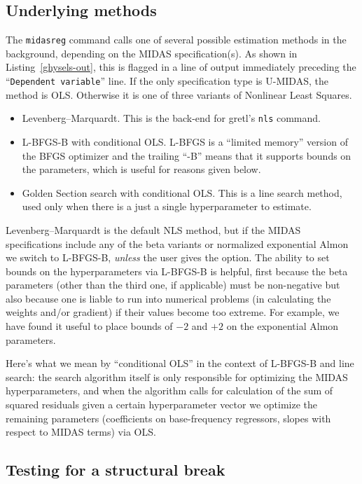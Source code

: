 \subsection{Underlying methods}

The \texttt{midasreg} command calls one of several possible estimation
methods in the background, depending on the MIDAS specification(s). As
shown in Listing~\ref{ghysels-out}, this is flagged in a line of
output immediately preceding the ``\texttt{Dependent variable}'' line.
If the only specification type is U-MIDAS, the method is
OLS. Otherwise it is one of three variants of Nonlinear Least Squares.
\begin{itemize}
\item Levenberg--Marquardt. This is the back-end for gretl's
  \texttt{nls} command.
\item L-BFGS-B with conditional OLS. L-BFGS is a ``limited memory''
  version of the BFGS optimizer and the trailing ``-B'' means that it
  supports bounds on the parameters, which is useful for reasons given
  below.
\item Golden Section search with conditional OLS. This is a line
  search method, used only when there is a just a single
  hyperparameter to estimate.
\end{itemize}

Levenberg--Marquardt is the default NLS method, but if the MIDAS
specifications include any of the beta variants or normalized
exponential Almon we switch to L-BFGS-B, \textit{unless} the user
gives the  option. The ability to set bounds on the
hyperparameters via L-BFGS-B is helpful, first because the beta
parameters (other than the third one, if applicable) must be
non-negative but also because one is liable to run into numerical
problems (in calculating the weights and/or gradient) if their values
become too extreme. For example, we have found it useful to place
bounds of $-2$ and $+2$ on the exponential Almon parameters.

Here's what we mean by ``conditional OLS'' in the context of L-BFGS-B
and line search: the search algorithm itself is only responsible for
optimizing the MIDAS hyperparameters, and when the algorithm calls for
calculation of the sum of squared residuals given a certain
hyperparameter vector we optimize the remaining parameters
(coefficients on base-frequency regressors, slopes with respect to
MIDAS terms) via OLS.

\subsection{Testing for a structural break}

